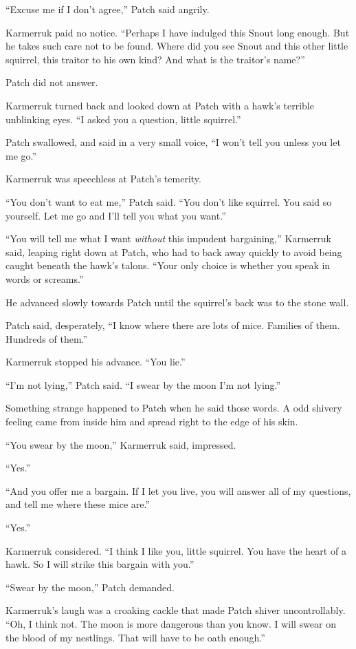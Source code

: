 \documentclass[12pt]{memoir}
\begin{document}
“Excuse me if I don’t agree,” Patch said angrily.

Karmerruk paid no notice. “Perhaps I have indulged this Snout long
enough. But he takes such care not to be found. Where did you see
Snout and this other little squirrel, this traitor to his own kind?
And what is the traitor’s name?”

Patch did not answer.

Karmerruk turned back and looked down at Patch with a hawk’s terrible
unblinking eyes. “I asked you a question, little squirrel.”

Patch swallowed, and said in a very small voice, “I won’t tell you
unless you let me go.”

Karmerruk was speechless at Patch’s temerity.

“You don’t want to eat me,” Patch said. “You don’t like squirrel. You
said so yourself. Let me go and I’ll tell you what you want.”

“You will tell me what I want \textit{without} this impudent
bargaining,” Karmerruk said, leaping right down at Patch, who had to
back away quickly to avoid being caught beneath the hawk’s
talons. “Your only choice is whether you speak in words or screams.”

He advanced slowly towards Patch until the squirrel’s back was to the
stone wall.

Patch said, desperately, “I know where there are lots of
mice. Families of them. Hundreds of them.”

Karmerruk stopped his advance. “You lie.”

“I’m not lying,” Patch said. “I swear by the moon I’m not lying.”

Something strange happened to Patch when he said those words. A odd
shivery feeling came from inside him and spread right to the edge of
his skin.

“You swear by the moon,” Karmerruk said, impressed.

“Yes.”

“And you offer me a bargain. If I let you live, you will answer all of
my questions, and tell me where these mice are.”

“Yes.”

Karmerruk considered. “I think I like you, little squirrel. You have
the heart of a hawk. So I will strike this bargain with you.”

“Swear by the moon,” Patch demanded.

Karmerruk’s laugh was a croaking cackle that made Patch shiver
uncontrollably. “Oh, I think not. The moon is more dangerous than you
know. I will swear on the blood of my nestlings. That will have to be
oath enough.”
\end{document}
